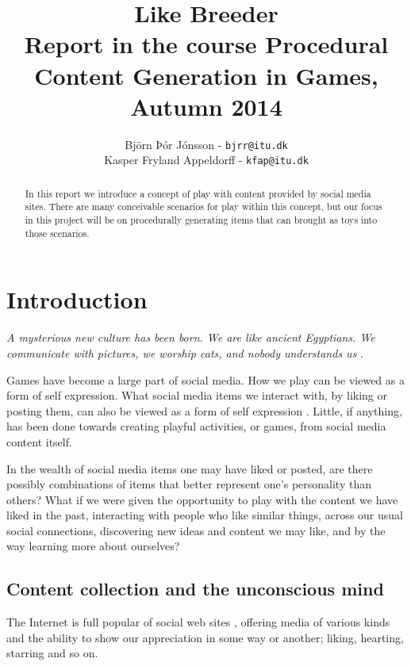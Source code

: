 \documentclass[]{article}
\title{Like Breeder\\ \small Report in the course Procedural Content Generation in Games, Autumn 2014}
\author{Björn Þór Jónsson - \texttt{bjrr@itu.dk}\\Kasper Fryland Appeldorff - \texttt{kfap@itu.dk}}
\begin{document}

\maketitle
\listoftodos %
\newpage
\begin{abstract}
In this report we introduce a concept of play with content provided by social media sites.  There are many conceivable scenarios for play within this concept, but our focus in this project will be on procedurally generating items that can brought as toys into those scenarios.
\end{abstract}



\section{Introduction}
\label{sec:Introduction}

\begin{center}
\textit{A mysterious new culture has been born. We are like ancient Egyptians. We communicate with pictures, we worship cats, and nobody understands us} \cite{gross2013makes}.
\end{center}


Games have become a large part of social media.  How we play can be viewed as a form of self expression\cite{sicart2014play}.  What social media items we interact with, by liking or posting them, can also be viewed as a form of self expression \cite{bargh2002can}.  Little, if anything, has been done towards creating playful activities, or games, from social media content itself.

In the wealth of social media items one may have liked or posted, are there possibly
combinations of items that better represent one's personality than others?  What if we were given the opportunity to play with the content we have liked in the past, interacting with people who like similar things, across our usual social connections, discovering new ideas and content we may like, and by the way learning more about ourselves?


\subsection{Content collection and the unconscious mind}

The Internet is full popular of social web sites \cite{LeadingSocialNetworks}, offering media of various kinds and the ability to show our appreciation in some way or another; liking, hearting, starring and so on.
\end{document}
